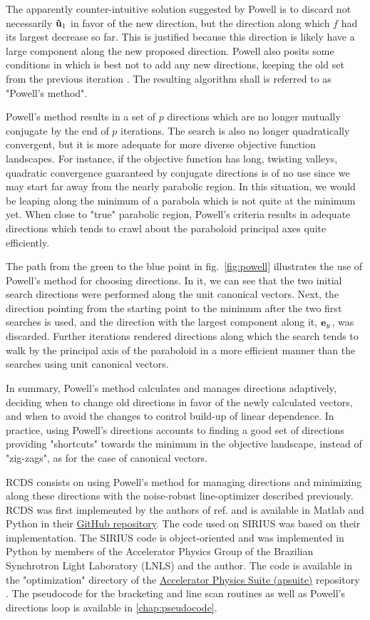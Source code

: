 The apparently counter-intuitive solution suggested by Powell is to discard not necessarily $\vu{u}_1$ in favor of the new direction, but the direction along which $f$ had its largest decrease so far. This is justified because this direction is likely have a large component along the new proposed  direction. Powell also posits some conditions in which is best not to add any new directions, keeping the old set from the previous iteration \cite[section 10.7]{press_numerical_2007}. The resulting algorithm shall is referred to as "Powell's method".

Powell's method results in a set of $p$ directions which are no longer mutually conjugate by the end of $p$ iterations. The search is also no longer quadratically convergent, but it is more adequate for more diverse objective function landscapes. For instance, if the objective function has long, twisting valleys, quadratic convergence guaranteed by conjugate directions is of no use since we  may start far away from the nearly parabolic region. In this situation, we would be leaping along the minimum of a parabola which is not quite at the minimum yet. When close to "true" parabolic region, Powell's criteria results in adequate directions which tends to crawl about the paraboloid principal axes quite efficiently.

The path from the green to the blue point in fig.~\ref{fig:powell} illustrates the use of Powell's method for choosing directions. In it, we can see that the two initial search directions were performed along the unit canonical vectors. Next, the direction pointing from the starting point to the minimum after the two first searches is used, and the direction with the largest component along it, $\vb{e}_y$, was discarded. Further iterations rendered directions along which the search tends to walk by the principal axis of the paraboloid in a more efficient manner than the searches using unit canonical vectors.

In summary, Powell's method calculates and manages directions adaptively, deciding when to change old directions in favor of the newly calculated  vectors, and when to avoid the changes to control build-up of linear dependence. In practice, using Powell's directions accounts to finding a good set of directions providing "shortcuts" towards the minimum in the objective landscape, instead of "zig-zags", as for the case of canonical vectors.

RCDS consists on using Powell's method for managing directions and minimizing along these directions with the noise-robust line-optimizer described previously. RCDS was first implemented by the authors of ref.\cite{huang_algorithm_2013} and is available in Matlab and Python in their \href{https://github.com/SPEAR3-ML/RCDS}{GitHub repository}. The code used on SIRIUS was based on their implementation. The SIRIUS code is object-oriented and was  implemented in Python by members of the Accelerator Physics Group of the Brazilian Synchrotron Light Laboratory (LNLS) and the author. The code is available in the "optimization" directory of the \href{https://github.com/lnls-fac/apsuite}{Accelerator Physics Suite (apsuite)} repository \cite{apsuite}. The pseudocode for the bracketing and line scan routines as well as Powell's directions loop is available in \ref{chap:pseudocode}.
